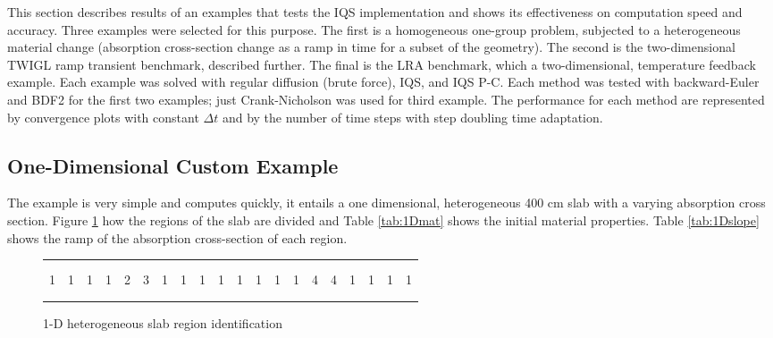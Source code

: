 \documentclass[12pt]{scrartcl}
\begin{document}
This section describes results of an examples that tests the IQS implementation and shows its effectiveness on computation speed and accuracy.  Three examples were selected for this purpose.  The first is a homogeneous one-group problem, subjected to a heterogeneous material change (absorption cross-section change as a ramp in time for a subset of the geometry).  The second is the two-dimensional TWIGL ramp transient benchmark, described further.  The final is the LRA benchmark, which a two-dimensional, temperature feedback example.  Each example was solved with regular diffusion (brute force), IQS, and IQS P-C.  Each method was tested with backward-Euler and BDF2 for the first two examples; just Crank-Nicholson was used for third example.  The performance for each method are represented by convergence plots with constant $\Delta t$ and by the number of time steps with step doubling time adaptation.

\subsection{One-Dimensional Custom Example}

The example is very simple and computes quickly, it entails a one dimensional, heterogeneous 400 cm slab with a varying absorption cross section.   Figure \ref{fig:slab} how the regions of the slab are divided and Table \ref{tab:1Dmat} shows the initial material properties.  Table \ref{tab:1Dslope} shows the ramp of the absorption cross-section of each region.

\begin{figure}[!htbp]
\begin{center}
\begin{tabular}{| l | l | l | l | l | l | l | l | l | l | l | l | l | l | l | l | l | l | l | l |}
\hline \hline \hline
  &   &   &   &   &   &    &    &   &   &   &   &   &   &   &   &   &   &   &   \\
  &   &   &   &   &   &    &    &   &   &   &   &   &   &   &   &   &   &   &   \\
1 & 1 & 1 & 1 & 2 & 3 & 1 & 1 & 1 & 1 & 1 & 1 & 1 & 1 & 4 & 4 & 1 & 1 & 1 & 1 \\
  &   &   &   &   &   &    &    &   &   &   &   &   &   &   &   &   &   &   &   \\
  &   &   &   &   &   &    &    &   &   &   &   &   &   &   &   &   &   &   &   \\
\hline \hline \hline
\end{tabular}
\caption{1-D heterogeneous slab region identification}
\label{fig:slab}
\end{center}
\end{figure}
\end{document}
